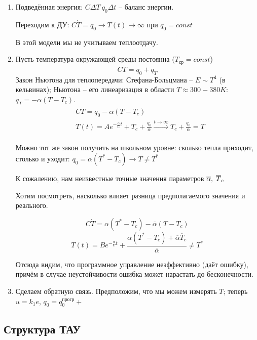 \documentclass[main.tex]{subfiles}
\begin{document}
\begin{enumerate}
	\item Подведённая энергия: $ C \Delta T \ q_0 \Delta t $ -- баланс энергии.
	
	Переходим к ДУ: $ C \dot T = q_0 \longrightarrow T(t) \to \infty $ при $ q_0 = const $
	
	В этой модели мы не учитываем теплоотдачу.
	
	\item Пусть температура окружающей среды постоянна ($ T_{\text{ср}} = const $)
	$$ C \dot T = q_0 + q_T $$
	Закон Ньютона для теплопередачи: Стефана-Больцмана -- $ E \sim T^4 $ (в кельвинах); Ньютона -- его линеаризация в области $ T \approx 300-380 K $: $ q_T = - \alpha(T - T_c) $.
	\begin{align*}
		& C\dot T = q_0 - \alpha (T - T_c) \\
		& T(t) = Ae^{-\frac{\alpha}{C}t} + T_c + \frac{q_0}{\alpha} \xrightarrow{t \to \infty} T_c + \frac{q_0}{\alpha} = T \\
	\end{align*}
	
	Можно тот же закон получить на школьном уровне: сколько тепла приходит, столько и уходит: $q_0 = \alpha (T^* - T_c) \longrightarrow T \ne T^* $
	
	К сожалению, нам неизвестные точные значения параметров $ \overline \alpha, \thickspace \overline T_c $
	
	Хотим посмотреть, насколько влияет разница предполагаемого значения и реального.
	
	$$ C\dot T = \alpha (T^* - T_c) - \overline{\alpha}(T - T_c) $$
	$$ T(t) = Be^{- \frac{\overline{\alpha}}{C}t} + \frac{\alpha(T^* - T_c) + \overline{\alpha} \overline{T}_c}{\overline{\alpha}} \ne T^* $$
	
	Отсюда видим, что программное управление неэффективно (даёт ошибку), причём в случае неустойчивости ошибка может нарастать до бесконечности.
	
	\item Сделаем обратную связь. Предположим, что мы можем измерять $ T $; теперь $ u = k_1 e $, $ q_0 = q_0^{\text{прогр}} +  $
	
		
\end{enumerate}

\subsection{Структура ТАУ}
\end{document}

